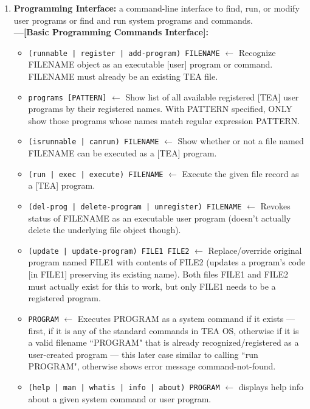 \documentclass[a4paper, 18pt]{book} %
\begin{document}
{{{\begin{enumerate}
{}

\item {  \textbf{Programming Interface:} a command-line interface to find, run, or modify user programs or find and run system programs and commands.\\
\textbf{---[Basic Programming Commands Interface]:}
\begin{itemize}
\item \texttt{(runnable | register | add-program) FILENAME} $\leftarrow$ Recognize FILENAME object as an executable [user] program or command. FILENAME must already be an existing TEA file.
\item \texttt{programs [PATTERN]} $\leftarrow$ Show list of all available registered [TEA]  user programs by their registered names. With PATTERN specified, ONLY show those programs whose names match regular expression PATTERN.
\item \texttt{(isrunnable | canrun) FILENAME} $\leftarrow$ Show whether or not a file named FILENAME can be executed as a [TEA] program.
\item \texttt{(run | exec | execute) FILENAME} $\leftarrow$ Execute the given file record as a [TEA] program.
\item \texttt{(del-prog | delete-program | unregister) FILENAME} $\leftarrow$ Revokes status of FILENAME as an executable user program (doesn't actually delete the underlying file object though).
\item \texttt{(update | update-program) FILE1 FILE2} $\leftarrow$ Replace/override original program named FILE1 with contents of FILE2 (updates a program's code [in FILE1] preserving its existing name). Both files FILE1 and FILE2 must actually exist for this to work, but only FILE1 needs to be a registered program.
\item \texttt{PROGRAM} $\leftarrow$ Executes PROGRAM as a system command if it exists --- first, if it is any of the standard commands in TEA OS, otherwise if it is a valid filename ``PROGRAM" that is already recognized/registered as a user-created program --- this later case similar to calling ``run PROGRAM", otherwise shows error message command-not-found.
\item \texttt{(help | man | whatis | info | about) PROGRAM} $\leftarrow$ displays help info about a given system command or user program.
\end{itemize}

}




\end{enumerate}}}}
\end{document}
